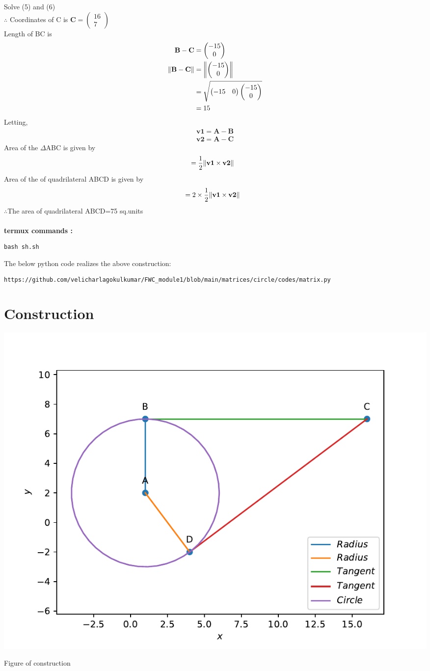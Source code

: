 \documentclass[10pt, a4paper]{article}
\newcommand{\myvec}[1]{\ensuremath{\begin{pmatrix}#1\end{pmatrix}}}
\let\vec\mathbf
\begin{document}
Solve (5) and (6) \\
$\therefore$ Coordinates of C is  $\vec{C} = \myvec{16 \\ 7}$\\
Length of BC is  
	\begin{align}
			\vec{B}-\vec{C} &= \myvec{-15 \\ 0}\\
            \norm{\vec{B}-\vec{C}} &=\norm{\myvec{-15 \\ 0}}\\
			&=\sqrt{\myvec{-15 & 0}\myvec{-15 \\ 0}} \\
			&=15
\end{align}
Letting,
\begin{align}
\vec{v1}=\vec{A}-\vec{B}\\
\vec{v2}=\vec{A}-\vec{C}
\end{align}		
	Area of the $\Delta$ABC is given by 
	\begin{align}
&=\frac{1}{2}\norm{\vec{v1}\times\vec{v2}}
\end{align}
	Area of the of quadrilateral ABCD is given by 
	\begin{align}
&=2\times\frac{1}{2}\norm{\vec{v1}\times\vec{v2}}
\end{align}
$\therefore$The area of quadrilateral ABCD=75 sq.units\\~\\
\textbf{termux commands :}
\begin{lstlisting}
bash sh.sh
\end{lstlisting}
The below python code realizes the above construction:

\begin{lstlisting}
https://github.com/velicharlagokulkumar/FWC_module1/blob/main/matrices/circle/codes/matrix.py
\end{lstlisting}
 \section{Construction}
  \includegraphics[scale=0.54]{matrix.pdf}
  	\begin{center}
  Figure of construction
  	\end{center}
%
\end{document}
